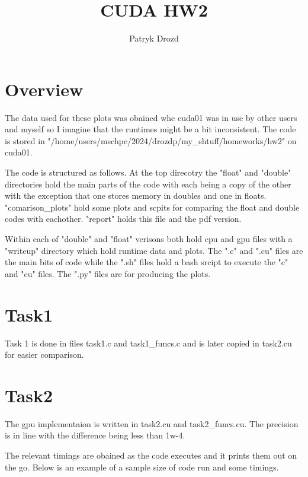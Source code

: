 \documentclass[a4paper]{article}
\title{CUDA HW2}
\author{Patryk Drozd}
\begin{document}
\date{}
\maketitle

\section{Overview}

	The data used for these plots was obained whe cuda01 was in use by other
	users and myself so I imagine that the runtimes might be a bit inconsistent.
	The code is stored in "/home/users/mschpc/2024/drozdp/my\_shtuff/homeworks/hw2"
	on cuda01.

	The code is structured as follows. At the top direcotry the "float" and "double" 
	directories hold the main parts of the code with each being a copy of the other
	with the exception that one stores memory in doubles and one in floats. 
	"comarison\_plots" hold some plots and scpits for comparing the float and double
	codes with eachother. "report" holds this file and the pdf version. 

	Within each of "double" and "float" verisons both hold cpu and gpu files
	with a "writeup" directory which hold runtime data and plots. The ".c" and ".cu"
	files are the main bits of code while the ".sh" files hold a bash srcipt to 
	execute the "c" and "cu" files. The ".py" files are for producing the plots.

\section{Task1}

    Task 1 is done in files task1.c and task1\_funcs.c and is later copied in 
	task2.cu for easier comparison. 

\section{Task2}
		
	The gpu implementaion is written in task2.cu and task2\_funcs.cu. 
	The precision is in line with the difference being less than 1w-4.

	The relevant timings are obained as the code executes and it prints them out
	on the go. Below is an example of a sample size of code run and some timings.

	\begin{verbatim}
		
	\end{verbatim}
\end{document}
